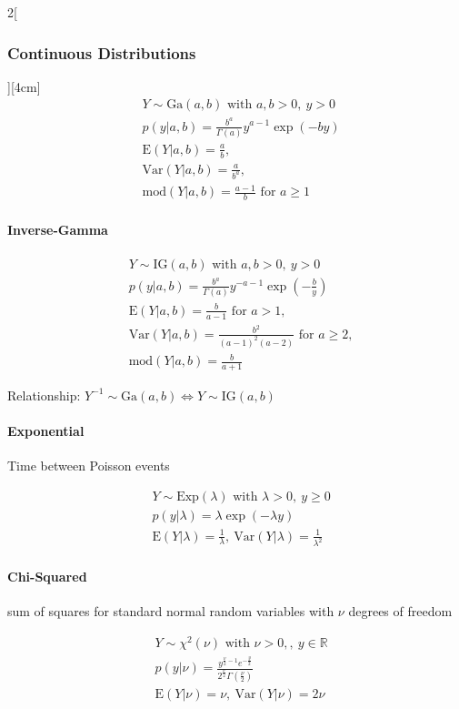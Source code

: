 \documentclass[8pt]{extarticle}
\begin{document}
\begin{multicols}{2}[\subsubsection{Continuous Distributions}][4cm]
    \begin{align*}
    & Y \sim \mathrm{Ga}(a, b) \text{ with } a,b > 0,\: y > 0\\
    & p(y|a, b) = \frac{ b^a }{\Gamma (a)} y^{a-1} \exp (-by) \\
    & \mathrm{E}(Y|a, b) = \frac{a}{b},\\
    & \mathrm{Var}(Y|a, b) = \frac{a}{b^a}, \\
    & \mathrm{mod}(Y|a, b) = \frac{a-1}{b} \text{ for } a \ge 1
  \end{align*}

  	\paragraph{Inverse-Gamma}
  
    \begin{align*}
    & Y \sim \mathrm{IG}(a, b) \text{ with } a,b > 0,\: y > 0\\
    & p(y|a, b) = \frac{ b^a }{\Gamma (a)} y^{-a-1} \exp (-\frac{b}{y}) \\
    & \mathrm{E}(Y|a, b) = \frac{b}{a-1} \text{ for } a > 1,\\
    & \mathrm{Var}(Y|a, b) = \frac{b^2}{(a-1)^2(a-2)} \text{ for } a \ge 2, \\
    & \mathrm{mod}(Y|a, b) = \frac{b}{a+1}
  \end{align*}
  
\noindent Relationship: $Y^{-1} \sim \mathrm{Ga}(a, b) \Leftrightarrow Y \sim \mathrm{IG}(a, b)$
  
  
  	\paragraph{Exponential} Time between Poisson events
  
    \begin{align*}
    & Y \sim \mathrm{Exp}(\lambda) \text{ with } \lambda > 0,\: y \geq 0\\
    & p(y|\lambda) = \lambda\exp (-\lambda y) \\
    & \mathrm{E}(Y|\lambda) = \frac{1}{\lambda}, \:
	\mathrm{Var}(Y|\lambda) = \frac{1}{\lambda^2}
  \end{align*}
  
  
  	\paragraph{Chi-Squared} sum of squares for standard normal random variables with $\nu$ degrees of freedom
  
    \begin{align*}
    & Y \sim \chi^2(\nu) \text{ with } \nu > 0,,\: y \in \mathbb{R}\\
    & p(y|\nu) = \frac{y^{\frac{\nu}{2}-1}e^{-\frac{y}{2}}}{2^{\frac{\nu}{2}}\Gamma \left(\frac{\nu}{2}\right)} \\
    & \mathrm{E}(Y|\nu) = \nu, \:
	\mathrm{Var}(Y|\nu) = 2\nu
  \end{align*}

\end{multicols}
\end{document}
